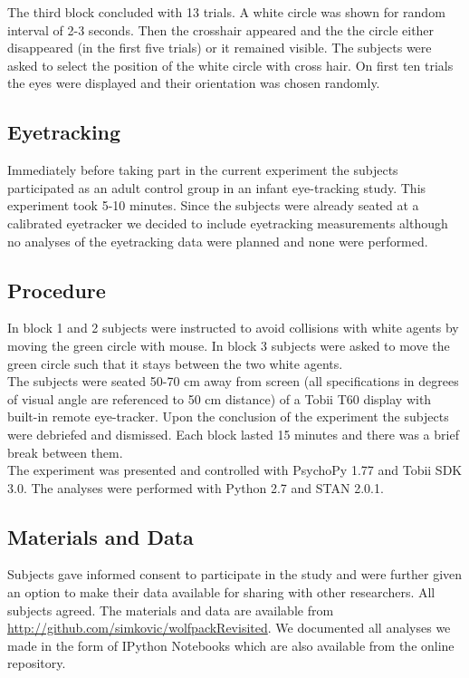 \documentclass{article}
\begin{document}
The third block concluded with 13 trials. A white circle was shown for random interval of 2-3 seconds. Then the crosshair appeared and the the circle either disappeared (in the first five trials) or it remained visible. The subjects were asked to select the position of the white circle with cross hair. On first ten trials the eyes were displayed and their orientation was chosen randomly. \\
 
\subsection{Eyetracking}
Immediately before taking part in the current experiment the subjects participated as an adult control group in an infant eye-tracking study. 
This experiment took 5-10 minutes. 
Since the subjects were already seated at a calibrated eyetracker we decided to include eyetracking measurements although no analyses of the eyetracking data were planned and none were performed.

\subsection{Procedure}
In block 1 and 2 subjects were instructed to avoid collisions with white agents by moving the green circle with mouse. 
In block 3 subjects were asked to move the green circle such that it stays between the two white agents. \\
The subjects were seated 50-70 cm away from screen (all specifications in degrees of visual angle are referenced to 50 cm distance) of a Tobii T60 display with built-in remote eye-tracker. 
Upon the conclusion of the experiment the subjects were debriefed and dismissed. 
Each block lasted 15 minutes and there was a brief break between them.\\
The experiment was presented and controlled with PsychoPy 1.77 \citep{peirce07} and Tobii SDK 3.0. 
The analyses were performed with Python 2.7 and STAN 2.0.1.

\subsection{Materials and Data}
Subjects gave informed consent to participate in the study and were further given an option to make their data available for sharing with other researchers. 
All subjects agreed. 
The materials and data are available from \url{http://github.com/simkovic/wolfpackRevisited}. 
We  documented all analyses we made in the form of IPython Notebooks which are also available from the online repository. 
\end{document}
